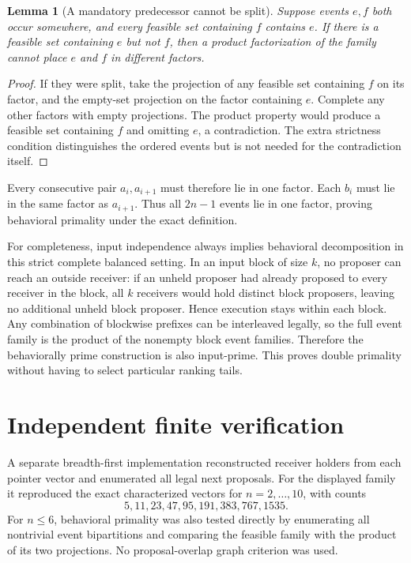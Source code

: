 \documentclass[11pt]{article}
\newtheorem{lemma}{Lemma}
\begin{document}
\begin{lemma}[A mandatory predecessor cannot be split]
Suppose events $e,f$ both occur somewhere, and every feasible set containing $f$ contains $e$. If there is a feasible set containing $e$ but not $f$, then a product factorization of the family cannot place $e$ and $f$ in different factors.
\end{lemma}
\begin{proof}
If they were split, take the projection of any feasible set containing $f$ on its factor, and the empty-set projection on the factor containing $e$. Complete any other factors with empty projections. The product property would produce a feasible set containing $f$ and omitting $e$, a contradiction. The extra strictness condition distinguishes the ordered events but is not needed for the contradiction itself.
\end{proof}
Every consecutive pair $a_i,a_{i+1}$ must therefore lie in one factor. Each $b_i$ must lie in the same factor as $a_{i+1}$. Thus all $2n-1$ events lie in one factor, proving behavioral primality under the exact definition.

For completeness, input independence always implies behavioral decomposition in this strict complete balanced setting. In an input block of size $k$, no proposer can reach an outside receiver: if an unheld proposer had already proposed to every receiver in the block, all $k$ receivers would hold distinct block proposers, leaving no additional unheld block proposer. Hence execution stays within each block. Any combination of blockwise prefixes can be interleaved legally, so the full event family is the product of the nonempty block event families. Therefore the behaviorally prime construction is also input-prime. This proves double primality without having to select particular ranking tails.

\section*{Independent finite verification}
A separate breadth-first implementation reconstructed receiver holders from each pointer vector and enumerated all legal next proposals. For the displayed family it reproduced the exact characterized vectors for $n=2,\ldots,10$, with counts
\[
 5,11,23,47,95,191,383,767,1535.
\]
For $n\leq6$, behavioral primality was also tested directly by enumerating all nontrivial event bipartitions and comparing the feasible family with the product of its two projections. No proposal-overlap graph criterion was used.
\end{document}

